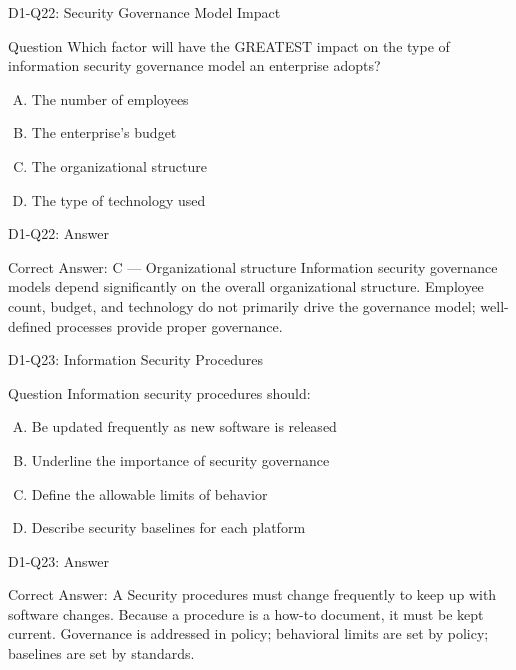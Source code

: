 \documentclass{beamer}
\begin{document}
	\begin{frame}{D1-Q22: Security Governance Model Impact}
		\begin{block}{Question}
			Which factor will have the GREATEST impact on the type of information security governance model an enterprise adopts?
		\end{block}
		\begin{enumerate}[(A)]
			\item The number of employees
			\item The enterprise's budget
			\item The organizational structure
			\item The type of technology used
		\end{enumerate}
	\end{frame}
	\begin{frame}{D1-Q22: Answer}
		\begin{block}{Correct Answer: C --- Organizational structure}
			Information security governance models depend significantly on the overall organizational structure. Employee count, budget, and technology do not primarily drive the governance model; well-defined processes provide proper governance.
		\end{block}
	\end{frame}
	
	\begin{frame}{D1-Q23: Information Security Procedures}
		\begin{block}{Question}
			Information security procedures should:
		\end{block}
		\begin{enumerate}[(A)]
			\item Be updated frequently as new software is released
			\item Underline the importance of security governance
			\item Define the allowable limits of behavior
			\item Describe security baselines for each platform
		\end{enumerate}
	\end{frame}
	\begin{frame}{D1-Q23: Answer}
		\begin{block}{Correct Answer: A}
			Security procedures must change frequently to keep up with software changes. Because a procedure is a how-to document, it must be kept current. Governance is addressed in policy; behavioral limits are set by policy; baselines are set by standards.
		\end{block}
	\end{frame}
	
\end{document}
